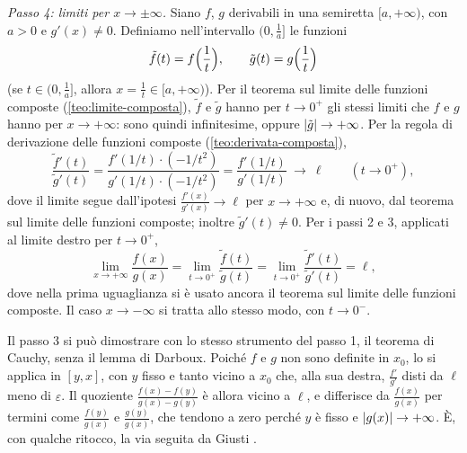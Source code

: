 \begin{dimostrazione}
\emph{Passo 4: limiti per $x\to\pm\infty$.} Siano $f$, $g$ derivabili in una semiretta
$[a,+\infty)$, con $a>0$ e $g'(x)\neq0$. Definiamo nell'intervallo $(0,\frac1a]$ le
funzioni
\[
  \tilde f(t)=f\Bigl(\frac1t\Bigr), \qquad \tilde g(t)=g\Bigl(\frac1t\Bigr)
\]
(se $t\in(0,\frac1a]$, allora $x=\frac1t\in[a,+\infty)$). Per il teorema sul limite delle
funzioni composte (\cref{teo:limite-composta}), $\tilde f$ e $\tilde g$ hanno per
$t\to0^{+}$ gli stessi limiti che $f$ e $g$ hanno per $x\to+\infty$: sono quindi
infinitesime, oppure $\lvert \tilde g\rvert\to+\infty$. Per la regola di derivazione delle
funzioni composte (\cref{teo:derivata-composta}),
\[
  \frac{\tilde f'(t)}{\tilde g'(t)}=\frac{f'(1/t)\cdot(-1/t^{2})}{g'(1/t)\cdot(-1/t^{2})}
  =\frac{f'(1/t)}{g'(1/t)}\ \longrightarrow\ \ell \qquad (t\to0^{+}),
\]
dove il limite segue dall'ipotesi $\frac{f'(x)}{g'(x)}\to\ell$ per $x\to+\infty$ e, di
nuovo, dal teorema sul limite delle funzioni composte; inoltre $\tilde g'(t)\neq0$. Per i passi 2 e 3, applicati al limite destro per $t\to0^{+}$,
\[
  \lim_{x\to+\infty}\frac{f(x)}{g(x)}=\lim_{t\to0^{+}}\frac{\tilde f(t)}{\tilde g(t)}
  =\lim_{t\to0^{+}}\frac{\tilde f'(t)}{\tilde g'(t)}=\ell ,
\]
dove nella prima uguaglianza si è usato ancora il teorema sul limite delle funzioni
composte. Il caso $x\to-\infty$ si tratta allo stesso modo, con $t\to0^{-}$.
\end{dimostrazione}

\begin{strategia}
Il passo 3 si può dimostrare con lo stesso strumento del passo 1, il teorema di Cauchy,
senza il lemma di Darboux. Poiché $f$ e $g$ non sono definite in $x_{0}$, lo si applica
in $[y,x]$, con $y$ fisso e tanto vicino a $x_{0}$ che, alla sua destra, $\frac{f'}{g'}$
disti da $\ell$ meno di $\varepsilon$. Il quoziente $\frac{f(x)-f(y)}{g(x)-g(y)}$ è allora vicino a $\ell$, e
differisce da $\frac{f(x)}{g(x)}$ per termini come $\frac{f(y)}{g(x)}$ e
$\frac{g(y)}{g(x)}$, che tendono a zero perché $y$ è fisso e $\lvert g(x)\rvert\to+\infty$. È,
con qualche ritocco, la via seguita da Giusti \cite{giusti}.
\end{strategia}

